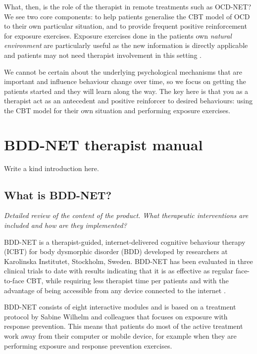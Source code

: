 \documentclass[]{book}
\theoremstyle{definition}
\theoremstyle{definition}
\theoremstyle{definition}
\theoremstyle{remark}
\begin{document}
What, then, is the role of the therapist in remote treatments such as
OCD-NET? We see two core components: to help patients generalise the CBT
model of OCD to their own particular situation, and to provide frequent
positive reinforcement for exposure exercises. Exposure exercises done
in the patients own \emph{natural environment} are particularly useful
as the new information is directly applicable and patients may not need
therapist involvement in this setting \citep{emmelkamp1989}.

We cannot be certain about the underlying psychological mechanisms that
are important and influence behaviour change over time, so we focus on
getting the patients started and they will learn along the way. The key
here is that you as a therapist act as an antecedent and positive
reinforcer to desired behaviours: using the CBT model for their own
situation and performing exposure exercises.

\hypertarget{bdd-net-therapist-manual}{%
\chapter{BDD-NET therapist manual}\label{bdd-net-therapist-manual}}

Write a kind introduction here.

\hypertarget{what-is-bdd-net}{%
\section{What is BDD-NET?}\label{what-is-bdd-net}}

\emph{Detailed review of the content of the product. What therapeutic
interventions are included and how are they implemented?}

BDD-NET is a therapist-guided, internet-delivered cognitive behaviour
therapy (ICBT) for body dysmorphic disorder (BDD) developed by
researchers at Karolinska Institutet, Stockholm, Sweden. BDD-NET has
been evaluated in three clinical trials to date with results indicating
that it is as effective as regular face-to-face CBT, while requiring
less therapist time per patients and with the advantage of being
accessible from any device connected to the internet
\citep{enander2014, enander2016}.

BDD-NET consists of eight interactive modules and is based on a
treatment protocol by Sabine Wilhelm and colleagues \citep{wilhelm2013}
that focuses on exposure with response prevention. This means that
patients do most of the active treatment work away from their computer
or mobile device, for example when they are performing exposure and
response prevention exercises.
\end{document}
